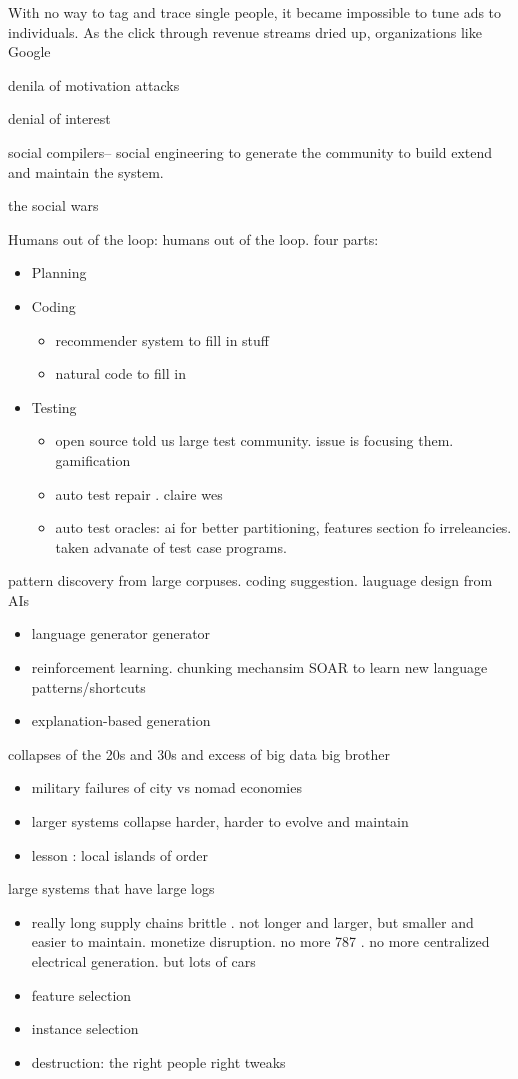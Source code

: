 \documentclass[journal]{IEEEtran}
\newcommand{\bi}{\begin{itemize}}
\newcommand{\ei}{\end{itemize}}
\begin{document}
\begin{itemize}
{With no way to tag and trace single people, it became impossible to tune ads to individuals.  As the click through revenue streams dried up, organizations like Google




denila of motivation attacks

denial of interest

social compilers-- social engineering to generate the community to build
extend and maintain the system. 

the social wars

Humans out of the loop: humans out of the loop. four parts:
\bi
\item Planning
\item Coding
\bi
\item recommender system to fill in stuff
\item natural code to fill in
\ei
\item Testing
\bi
\item open source told us large test community. issue is focusing them. gamification
\item auto test repair . claire wes
\item auto test oracles: ai for better partitioning, features section fo irreleancies.
taken advanate of test case programs. 
\ei
\ei

pattern discovery from large corpuses. coding suggestion. lauguage design from AIs 

\bi
\item language generator generator
\item reinforcement learning. chunking mechansim SOAR to learn new language patterns/shortcuts
\item explanation-based generation
\ei

collapses of the 20s and 30s and excess of big data big brother
\bi
\item military failures of city vs nomad economies
\item larger systems collapse harder, harder to evolve and maintain
\item lesson : local islands of order
\ei

large systems that have large logs
\bi
\item really long supply chains brittle . not longer and larger, but
smaller and easier to maintain. monetize disruption. no more 787 .
no more centralized electrical generation.
but lots of cars
\item feature selection
\item instance selection
\item destruction: the right people right tweaks
\ei

}
\end{itemize}
\end{document}
